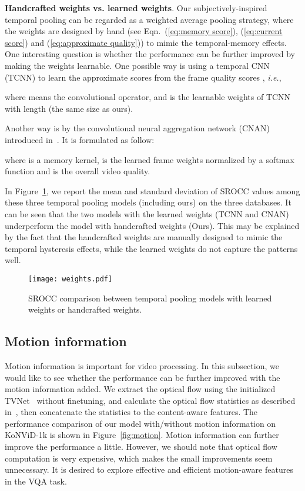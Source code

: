 \documentclass[sigconf]{acmart}
\begin{document}
\textbf{Handcrafted weights vs. learned weights}.
Our subjectively-inspired temporal pooling can be regarded as a weighted average pooling strategy, where the weights are designed by hand (see Eqn.~(\ref{eq:memory score}), (\ref{eq:current score}) and (\ref{eq:approximate quality})) to mimic the temporal-memory effects. One interesting question is whether the performance can be further improved by making the weights learnable. One possible way is using a temporal CNN (TCNN) to learn the approximate scores  from the frame quality scores , \textit{i.e.},

where  means the convolutional operator, and  is the learnable weights of TCNN with length  (the same size as ours). 

Another way is by the convolutional neural aggregation network (CNAN) introduced in~\cite{kim2018deep}.  It is formulated as follow:

where  is a memory kernel,  is the learned frame weights normalized by a softmax function and  is the overall video quality.

In Figure~\ref{fig:weights}, we report the mean and standard deviation of SROCC values among these three temporal pooling models (including ours) on the three databases. It can be seen that the two models with the learned weights (TCNN and CNAN) underperform the model with handcrafted weights (Ours). This may be explained by the fact that the handcrafted weights are manually designed to mimic the temporal hysteresis effects, while the learned weights do not capture the patterns well.

\begin{figure}[!htb]
\begin{center}
  \texttt{[image: weights.pdf]}
\end{center}
   \caption{SROCC comparison between temporal pooling models with learned weights or handcrafted weights.}
\label{fig:weights}
\end{figure}

\subsection{Motion information}
Motion information is important for video processing. In this subsection, we would like to see whether the performance can be further improved with the motion information added. We extract the optical flow using the initialized TVNet~\cite{fan2018end} without finetuning, and calculate the optical flow statistics as described in~\cite{manasa2016optical-NR}, then concatenate the statistics to the content-aware features. The performance comparison of our model with/without motion information on KoNViD-1k is shown in Figure~\ref{fig:motion}. Motion information can further improve the performance a little. However, we should note that optical flow computation is very expensive, which makes the small improvements seem unnecessary. It is desired to explore effective and efficient motion-aware features in the VQA task.
\end{document}
